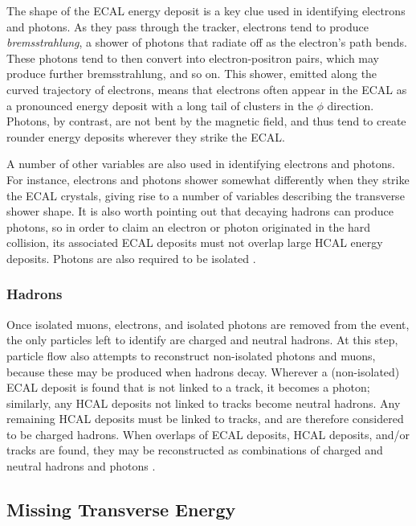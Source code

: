The shape of the ECAL energy deposit is a key clue used in identifying
electrons and photons. As they pass through the tracker, electrons
tend to produce \emph{bremsstrahlung}, a shower of photons that
radiate off as the electron's path bends. These photons tend to then
convert into electron-positron pairs, which may produce further
bremsstrahlung, and so on. This shower, emitted along the curved
trajectory of electrons, means that electrons often appear in the ECAL
as a pronounced energy deposit with a long tail of clusters in the $\phi$
direction. Photons, by contrast, are not bent by the magnetic field,
and thus tend to create rounder energy deposits wherever they strike
the ECAL.

A number of other variables are also used in identifying electrons and
photons. For instance, electrons and photons shower somewhat
differently when they strike the ECAL crystals, giving rise to a
number of variables describing the transverse shower shape. It is also
worth pointing out that decaying
hadrons can produce photons, so in order to
claim an electron or photon originated in the hard collision, its
associated ECAL deposits must not overlap large HCAL energy
deposits. Photons are also required to be isolated \cite{particleflow}.

\subsubsection{Hadrons}
\label{sssec:cms:pf:hadrons}

Once isolated muons, electrons, and isolated photons are removed from
the event, the only particles left to identify are charged and neutral
hadrons. At this step, particle flow also attempts to reconstruct
non-isolated photons and muons, because these may be produced when
hadrons decay. Wherever a (non-isolated) ECAL deposit is found that is
not linked to a track, it becomes a photon; similarly, any HCAL
deposits not linked to tracks become neutral hadrons. Any remaining
HCAL deposits must be linked to tracks, and are therefore considered
to be charged hadrons. When overlaps of ECAL deposits, HCAL deposits,
and/or tracks are found, they may be reconstructed as combinations of
charged and neutral hadrons and photons \cite{particleflow}.

\subsection{Missing Transverse Energy}
\label{ssec:cms:reco:met}

